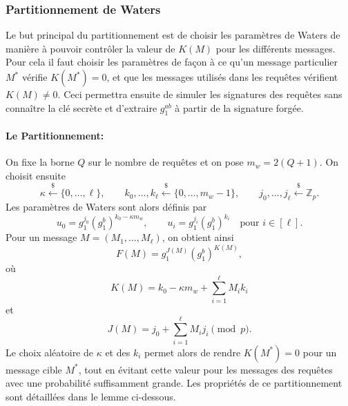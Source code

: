 \documentclass[10pt,a4paper]{article}
\theoremstyle{definition}
\theoremstyle{plain}
\theoremstyle{remark}
\newcommand{\sample}{\xleftarrow{\$}}
\begin{document}
\subsubsection{Partitionnement de Waters}

Le but principal du partitionnement est de choisir les paramètres de Waters de
manière à pouvoir contrôler la valeur de $K(M)$ pour les différents
messages. Pour cela il faut choisir les paramètres de façon à ce qu'un message
particulier $M^*$ vérifie $K(M^*)=0$, et que les messages utilisés
dans les requêtes vérifient $K(M)\neq0$. Ceci permettra ensuite de
simuler les signatures des requêtes sans connaître la clé secrète et
d'extraire $g_1^{ab}$ à partir de la signature forgée.

\paragraph{Le Partitionnement:}

On fixe la borne $Q$ sur le nombre de requêtes et on pose
$
m_w=2(Q+1).
$
On choisit ensuite
\[
\kappa\sample\{0,\ldots,\ell\},
\qquad
k_0,\ldots,k_\ell\sample\{0,\ldots,m_w-1\},
\qquad
j_0,\ldots,j_\ell\sample\mathbb{Z}_p.
\]
Les paramètres de Waters sont alors définis par
\[
u_0=g_1^{j_0}(g_1^b)^{k_0-\kappa m_w},
\qquad
u_i=g_1^{j_i}(g_1^b)^{k_i}
\quad\text{pour }i\in[\ell].
\]
Pour un message $M=(M_1,\ldots,M_\ell)$, on obtient ainsi
\[
F(M)=g_1^{J(M)}(g_1^b)^{K(M)},
\]
où
\[
K(M)=k_0-\kappa m_w+\sum_{i=1}^{\ell}M_i k_i
\]
et
\[
J(M)=j_0+\sum_{i=1}^{\ell}M_i j_i
\pmod p.
\]
Le choix aléatoire de $\kappa$ et des $k_i$ permet alors de rendre
$K(M^*)=0$ pour un message cible $M^*$, tout en évitant cette valeur
pour les messages des requêtes avec une probabilité suffisamment grande.
Les propriétés de ce partitionnement sont détaillées dans le lemme ci-dessous.
\end{document}
